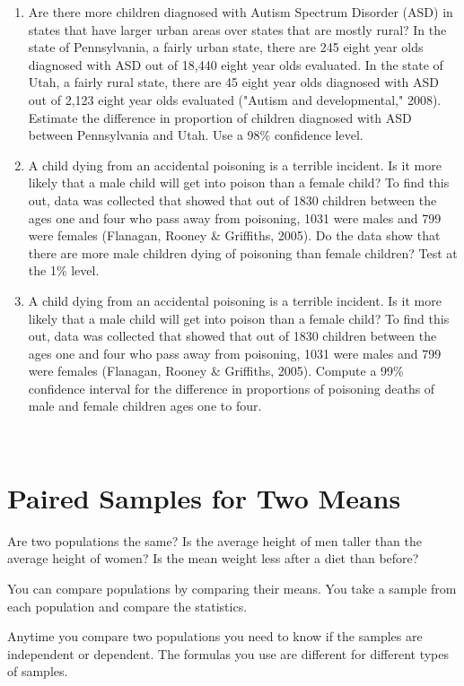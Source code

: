 \documentclass[]{book}
\begin{document}
\begin{enumerate}
\item
  Are there more children diagnosed with Autism Spectrum Disorder (ASD) in states that have larger urban areas over states that are mostly rural? In the state of Pennsylvania, a fairly urban state, there are 245 eight year olds diagnosed with ASD out of 18,440 eight year olds evaluated. In the state of Utah, a fairly rural state, there are 45 eight year olds diagnosed with ASD out of 2,123 eight year olds evaluated ("Autism and developmental," 2008). Estimate the difference in proportion of children diagnosed with ASD between Pennsylvania and Utah. Use a 98\% confidence level.
\item
  A child dying from an accidental poisoning is a terrible incident. Is it more likely that a male child will get into poison than a female child? To find this out, data was collected that showed that out of 1830 children between the ages one and four who pass away from poisoning, 1031 were males and 799 were females (Flanagan, Rooney \& Griffiths, 2005). Do the data show that there are more male children dying of poisoning than female children? Test at the 1\% level.
\item
  A child dying from an accidental poisoning is a terrible incident. Is it more likely that a male child will get into poison than a female child? To find this out, data was collected that showed that out of 1830 children between the ages one and four who pass away from poisoning, 1031 were males and 799 were females (Flanagan, Rooney \& Griffiths, 2005). Compute a 99\% confidence interval for the difference in proportions of poisoning deaths of male and female children ages one to four.
\end{enumerate}

\textbf{\\
}

\hypertarget{paired-samples-for-two-means}{%
\section{Paired Samples for Two Means}\label{paired-samples-for-two-means}}

Are two populations the same? Is the average height of men taller than the average height of women? Is the mean weight less after a diet than before?

You can compare populations by comparing their means. You take a sample from each population and compare the statistics.

Anytime you compare two populations you need to know if the samples are independent or dependent. The formulas you use are different for different types of samples.
\end{document}
